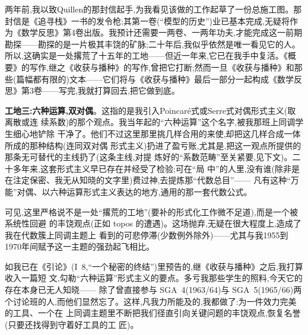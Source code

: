 两年前,我以致Quillen的那封信起手,为我看见该做的工作起草了一份总施工图。那封信是《追寻栈》一书的发令枪;其第一卷(“模型的历史”)业已基本完成,无疑将作为《数学反思》第4卷出版。我预计还需要一两卷、一两年功夫,才能完成这一前期勘探——勘探的是一片极其丰饶的矿脉;二十年后,我似乎依然是唯一看见它的人。所以,这确实是一处撂荒了十五年的工地——但近一年来,它已在我手中复活。《概要》的写作,继之《收获与播种》的写作,曾把它打断;然而一旦《收获与播种》和那些(篇幅都有限的)文本——它们将与《收获与播种》最后一部分一起构成《数学反思》第3卷——写完,我就打算回去,把它做到底。

\pmark{}\textbf{工地三:六种运算,双对偶}。这指的是我引入Poincaré式或Serre式对偶形式主义(取离散或连
续系数)的那个观点。我当年起的“六种运算”这个名字,被我那班上同调学生细心地铲除
干净了。他们不过这里那里挑几样合用的来使,却把这几样合成一体所成的那种结构(连同双对偶
形式主义)扔进了盈亏账,尤其是,把这一观点所提供的那条无可替代的主线扔了(这条主线,对提
炼好的“系数范畴”至关紧要,见下文)。二十多年来,这套形式主义早已存在并经受了检验;可在“局
中”的人里,没有谁(除非是在注定保密、我无从知晓的文字里)费过神,去提炼那“代数总目”——
凡有这种“万能”对偶、以六种运算形式主义表达的地方,通用的那一套代数公式。

可见,这里严格说不是一处“撂荒的工地”(要补的形式化工作微不足道),而是一个被系统性回避
的丰饶观点(正如 topos 的遭遇)。这场抛弃,无疑在很大程度上,造成了我在代数簇上同调主题上
看到的可悲停滞(少数例外除外)——尤其与我1955到1970年间赋予这一主题的强劲起飞相比。

如我已在《引论》(I~8,“一个秘密的终结”)里预告的,继《收获与播种》之后,我打算收入一篇短
文,勾勒“六种运算”形式主义的要点。多亏我那些\dmark{}学生的照料,今天它的存在本身已无人知晓——
除了曾直接参与 SGA~4(1963/64)与 SGA~5(1965/66)两个讨论班的人,而他们显然忘了。这样,凡我力所能及的,我都做了:为一件效力完美的工具、一个在
上同调主题里不断把我们径直引向关键问题的丰饶观点,恢复名誉(只要还找得到守着好工具的工
匠)。

